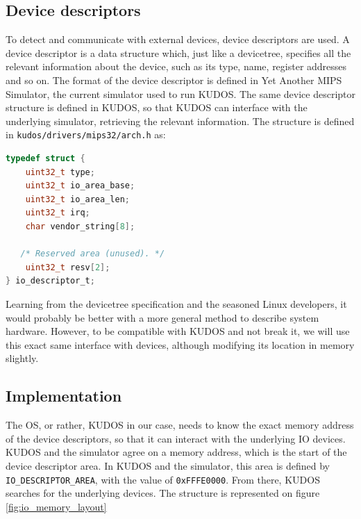 \subsection{Device descriptors}
To detect and communicate with external devices, device descriptors are used.
A device descriptor is a data structure which, just like a devicetree, specifies
all the relevant information about the device, such as its type, name, register
addresses and so on. The format of the device descriptor is defined in Yet Another
MIPS Simulator, the current simulator used to run KUDOS. The same device descriptor
structure is defined in KUDOS, so that KUDOS can interface with the underlying
simulator, retrieving the relevant information.
The structure is defined in \texttt{kudos/drivers/mips32/arch.h}\cite{kudos} as:
\begin{lstlisting}[language=c]
typedef struct {
    uint32_t type;
    uint32_t io_area_base;
    uint32_t io_area_len;
    uint32_t irq;
    char vendor_string[8];

   /* Reserved area (unused). */
    uint32_t resv[2];
} io_descriptor_t;
\end{lstlisting}

Learning from the devicetree specification and the seasoned Linux developers,
it would probably be better with a more general method to describe system
hardware. However, to be compatible with KUDOS and not break it, we will use
this exact same interface with devices, although modifying its location in
memory slightly.


\subsection{Implementation}
The OS, or rather, KUDOS in our case, needs to know the exact memory address of
the device descriptors, so that it can interact with the underlying IO devices.
KUDOS and the simulator agree on a memory address, which is the start of the
device descriptor area. In KUDOS and the simulator, this area is defined by
\texttt{IO\_DESCRIPTOR\_AREA}, with the value of \texttt{0xFFFE0000}. From there,
KUDOS searches for the underlying devices. The structure is represented on figure
\ref{fig:io_memory_layout}

